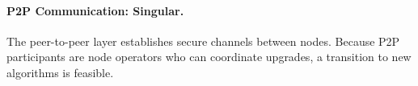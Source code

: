 \paragraph{P2P Communication: Singular.}\label{para:p2p-layered}
The peer-to-peer layer establishes secure channels between nodes.
Because P2P participants are node operators who can coordinate upgrades, a transition to new algorithms is feasible.
